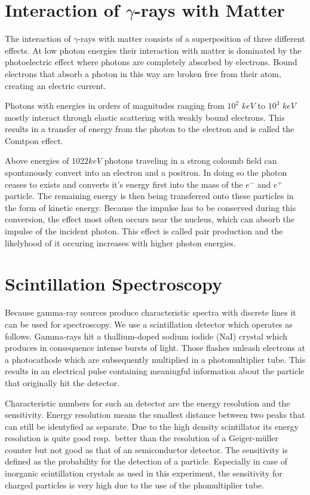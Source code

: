 \documentclass[bigchapter,colorback,accentcolor=tud4b,linedtoc,11pt]{tudreport}
\begin{document}
\section{Interaction of $\gamma$-rays with Matter}
The interaction of $\gamma$-rays with matter consists of a superposition
of three different effects. At low photon energies their interaction with matter
is dominated by the photoelectric effect where photons are completely absorbed
by electrons. Bound electrons that absorb a photon in this way are broken free
from their atom, creating an electric current.

Photons with energies in orders of magnitudes ranging from $10^2$ $keV$ to $10^3$ $keV$
mostly interact through elastic scattering with weakly bound electrons. This
results in a transfer of energy from the photon to the electron and is called
the Comtpon effect.

Above energies of $1022keV$ photons traveling in a strong coloumb field can
spontanously convert into an electron and a positron. In doing so the photon
ceases to exists and converts it's energy first into the mass of the $e^-$ and
$e^+$ particle. The remaining energy is then being transferred onto these
particles in the form of kinetic energy. Because the impulse has to be conserved
during this conversion, the effect most often occurs near the nucleus, which can
absorb the impulse of the incident photon. This effect is called pair production
and the likelyhood of it occuring increases with higher photon energies.



\section{Scintillation Spectroscopy}

Because gamma-ray sources produce characteristic spectra with discrete lines it can be used for spectroscopy. We use a scintillation detector which operates as follows. Gamma-rays hit a thallium-doped sodium iodide (NaI) crystal which produces in consequence intense bursts of light. Those flashes unleash electrons at a photocathode which are subsequently multiplied in a photomultiplier tube. This results in an electrical pulse containing meaningful information about the particle that originally hit the detector.

Characteristic numbers for such an detector are the energy resolution and the sensitivity. Energy resolution means the smallest distance between two peaks that can still be identyfied as separate. Due to the high density scintillator its energy resolution is quite good resp.\ better than the resolution of a Geiger-müller counter but not good as that of an semiconductor detector. The sensitivity is defined as the probability for the detection of a particle. Especially in case of inorganic scintillation crystals as used in this experiment, the sensitivity for charged particles is very high due to the use of the phomultiplier tube.
\end{document}

